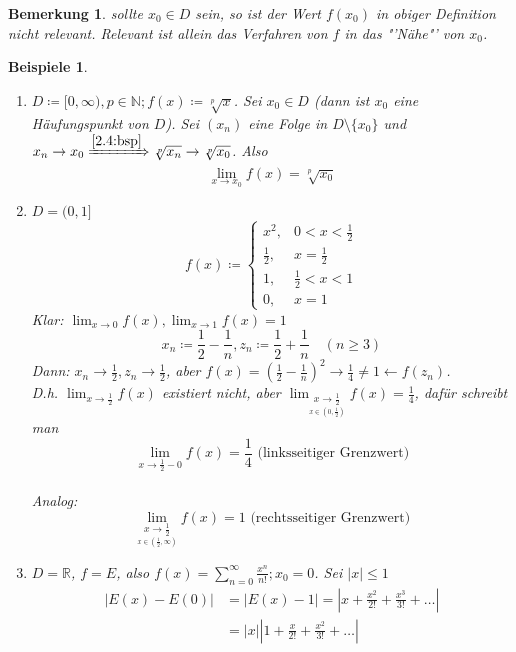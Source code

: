 \documentclass[12pt]{extreport} %
\newcommand{\N}{\mathbb{N}}
\newcommand{\R}{\mathbb{R}}
\theoremstyle{named}
\theoremstyle{dotless}
\newtheorem*{beispiele}{Beispiele}
\newtheorem*{bemerkung}{Bemerkung}
\begin{document}
\begin{bemerkung}
	sollte $x_{0} \in D$ sein, so ist der Wert $f(x_{0})$ in obiger Definition nicht relevant. Relevant ist allein das Verfahren von $f$ in das "'Nähe"' von $x_{0}$.	
\end{bemerkung}

 
\begin{beispiele} ~\
	\begin{enumerate}
		\item $D \coloneqq [0, \infty), p \in \N; f(x) \coloneqq \sqrt[p]{x}$. Sei $x_{0} \in D$ (dann ist $x_{0}$ eine Häufungspunkt von $D$). Sei $(x_{n})$ eine Folge in $D \setminus \{ x_{0} \}$ und $x_{n} \rightarrow x_{0} \xRightarrow[]{\ref{2.4:bsp}} \sqrt[p]{x_{n}} \rightarrow \sqrt[p]{x_{0}}$. Also
			$$ \lim_{x \rightarrow x_{0}} f(x) = \sqrt[p]{x_{0}} $$
		\item $D = (0, 1]$
			$$ f(x) \coloneqq \begin{cases} x^{2}, & 0 < x < \frac{1}{2} \\ \frac{1}{2}, & x = \frac{1}{2} \\ 1, & \frac{1}{2} < x < 1 \\ 0, & x = 1 \end{cases} $$
			Klar: $\lim_{x \rightarrow 0} f(x), \lim_{x \rightarrow 1} f(x) = 1$
			$$ x_{n} \coloneqq \frac{1}{2} - \frac{1}{n}, z_{n} \coloneqq \frac{1}{2} + \frac{1}{n} \quad (n \geq 3) $$
			Dann: $x_{n} \rightarrow \frac{1}{2}, z_{n} \rightarrow \frac{1}{2}$, aber $f(x) = \left( \frac{1}{2} - \frac{1}{n} \right)^{2} \rightarrow \frac{1}{4} \neq 1 \leftarrow f(z_{n})$. \\
			D.h. $\lim_{x \rightarrow \frac{1}{2}} f(x)$ existiert nicht, aber $\lim_{\underset{x \in (0, \frac{1}{2})}{x \rightarrow \frac{1}{2}}} f(x) = \frac{1}{4}$, dafür schreibt man 
			$$ \lim_{x \rightarrow \frac{1}{2}-0} f(x) = \frac{1}{4} \text{ (linksseitiger Grenzwert)} $$ \\
			Analog: 
			$$ \lim_{\underset{x \in (\frac{1}{2}, \infty)}{x \rightarrow \frac{1}{2}}} f(x) = 1 \text{ (rechtsseitiger Grenzwert)} $$ 
		\item $D = \R$, $f = E$, also $f(x) = \sum_{n=0}^{\infty} \frac{x^{n}}{n!}; x_{0} = 0$. Sei $|x| \leq 1$
			\begin{align*}
				|E(x) - E(0)| & = |E(x) - 1| = |x + \frac{x^{2}}{2!} + \frac{x^{3}}{3!} + \dotsc | \\
				& = |x| \left| 1 + \frac{x}{2!} + \frac{x^{2}}{3!} + \dotsc \right| \\

\end{align*}
\end{enumerate}
\end{beispiele}
\end{document}
